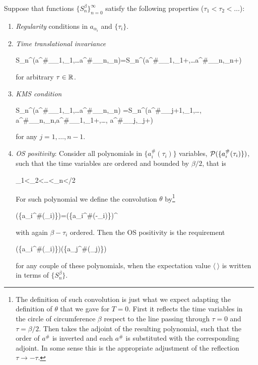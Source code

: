 \documentclass[../main/main.tex]{subfiles}
\begin{document}
\begin{theorem}\label{thm:OS-finite-T} Suppose that functions $\{S_n^\beta\}_{n=0}^\infty$ satisfy the following properties ($\tau_1<\tau_2<\ldots$): 

\begin{enumerate}[label=(\arabic*)]
	\item \emph{Regularity} conditions in $a_{\alpha_i}$ and $\{\tau_i\}$.
	\item \emph{Time translational invariance}
	\begin{eq}
		S_n^\beta(a^\#_{\alpha_1},\tau_1,\ldots a^\#_{\alpha_n},\tau_n)=S_n^\beta(a^\#_{\alpha_1},\tau_1+\tau,\ldots a^\#_{\alpha_n},\tau_n+\tau)
	\end{eq}
	for arbitrary $\tau\in\mathbb{R}$.
	\item \emph{KMS condition} 
	\begin{eq}
		S_n^\beta(a^\#_{\alpha_1},\tau_1,\ldots a^\#_{\alpha_n},\tau_n)
		=S_n^\beta(a^\#_{\alpha_{j+1}},\tau_1,\ldots, a^\#_{\alpha_n},\tau_n,a^\#_{\alpha_1},\tau_1+\beta,\ldots, a^\#_{\alpha_j},\tau_j+\beta)
	\end{eq}
	for any $j=1,\ldots,n-1$.
	\item \emph{OS positivity}: Consider all polynomials in $\{a_i^\#(\tau_i)\}$ variables, $\mathcal P(\{a_i^\#(\tau_i)\})$, such that the time variables are ordered and bounded by $\beta/2$, that is
	\begin{eq}
		\tau_1<\tau_2<\ldots<\tau_n<\beta/2
	\end{eq}
	For such polynomial we define the convolution $\theta$ by\footnote{The definition of such convolution is just what we expect adapting the definition of $\theta$ that we gave for $T=0$. First it reflects the time variables in the circle of circumference $\beta$ respect to the line passing through $\tau=0$ and $\tau=\beta/2$. Then takes the adjoint of the resulting polynomial, such that the order of $a^\#$ is inverted and each $a^\#$ is substituted with the corresponding adjoint. In some sense this is the appropriate adjustment of the reflection $\tau\to-\tau$.}
	\begin{eq}
		\theta\polyn(\{a_i^\#(\tau_i)\})=\polyn(\{a_i^\#(\beta-\tau_i)\})^\dagger
	\end{eq}
	with again $\beta-\tau_i$ ordered. Then the OS positivity is the requirement
	\begin{eq}
		\big\langle \polyn(\{a_i^\#(\tau_i)\})\theta \polyn(\{a_j^\#(\tau_j)\})\big\rangle\geq0
	\end{eq}
	for any couple of these polynomials, when the expectation value $\langle\ \rangle$ is written in terms of $\{S_n^\beta\}$. 
\end{enumerate}


\end{theorem}
\end{document}
